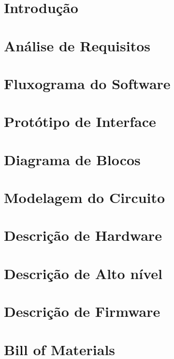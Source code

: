 \documentclass[a4paper, 11pt]{article}
\begin{document}
\selectfont


\tableofcontents
\newpage
\section{Introdução}

\newpage

\section{Análise de Requisitos}


\section{Fluxograma do Software}


\section{Protótipo de Interface}

\newpage



\section{Diagrama de Blocos}

\newpage

\section{Modelagem do Circuito}

\newpage

\section{Descrição de Hardware}

\newpage

\section{Descrição de Alto nível}

\newpage

\section{Descrição de Firmware}

\newpage

\section{Bill of Materials}

\end{document}
